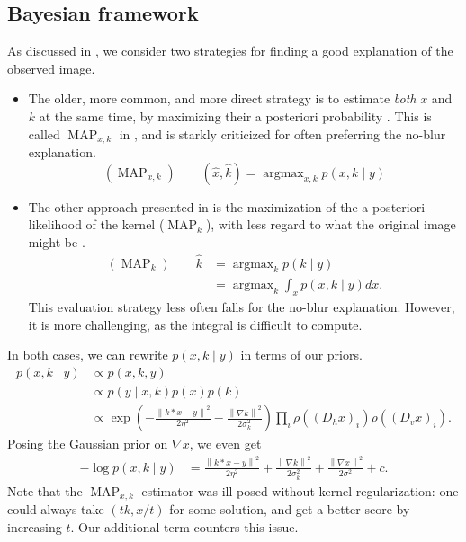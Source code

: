 \documentclass[english,a4paper]{article}
\theoremstyle{plain}
\theoremstyle{definition}
\theoremstyle{remark}
\DeclareMathOperator*{\argmax}{argmax}
\DeclareMathOperator{\MAP}{MAP}
\newcommand{\norm}[1]{\left\lVert #1 \right\rVert}
\begin{document}
\subsection{Bayesian framework}
As discussed in \cite{levin2009understanding,levin2011efficient}, we consider two strategies for finding a good explanation of the observed image.
\begin{itemize}
	\item The older, more common, and more direct strategy is to estimate \emph{both} $x$ and $k$ at the same time, by maximizing their a posteriori probability \cite{cho2009fast,cho2007removing,jia2007single,shan2008high,xu2010two}.
	This is called $\MAP_{x,k}$ in \cite{levin2011efficient,levin2009understanding}, and is starkly criticized for often preferring the no-blur explanation.
	\begin{equation}\label{eq:MAP_xk}
	(\MAP_{x,k}) \quad\quad (\hat{x},\hat{k}) = \argmax_{x,k} p(x,k \mid y)
	\end{equation}
	\item The other approach presented in \cite{levin2009understanding} is the maximization of the a posteriori likelihood of the kernel ($\MAP_k$), with less regard to what the original image might be \cite{fergus2006removing,whyte2012non}.
	\begin{align}\label{eq:MAP_k}
	(\MAP_k) \quad\quad \hat{k} &= \argmax_{k} p(k \mid y)\\
	&= \argmax_{k} \int_x p(x,k \mid y) dx \nonumber .
	\end{align}
	This evaluation strategy less often falls for the no-blur explanation. However, it is more challenging, as the integral is difficult to compute.
\end{itemize}

In both cases, we can rewrite $p(x,k \mid y)$ in terms of our priors.
\begin{align*}
p(x,k \mid y) &\propto p(x,k,y)\\
&\propto p(y \mid x,k) p(x) p(k)\\
&\propto \exp\left( -\frac{\norm{k*x-y}^2}{2\eta^2} - \frac{\norm{\nabla k}^2}{2 \sigma_k^2}  \right) \prod_i \rho((D_h x)_i) \rho((D_v x)_i) .
\end{align*}
Posing the Gaussian prior on $\nabla x$, we even get
\begin{align*}
-\log p(x,k \mid y) &= \frac{\norm{k*x-y}^2}{2\eta^2} + \frac{\norm{\nabla k}^2}{2 \sigma_k^2} + \frac{\norm{\nabla x}^2}{2\sigma^2} + c .
\end{align*}
Note that the $\MAP_{x,k}$ estimator was ill-posed without kernel regularization: one could always take $(tk,x/t)$ for some solution, and get a better score by increasing $t$.
Our additional term counters this issue.
\end{document}
